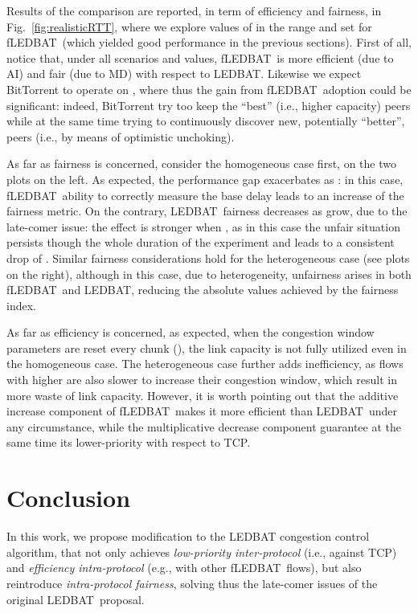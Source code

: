 \documentclass[conference]{IEEEtran}
\newcommand{\figR}[1]{Fig.~\ref{fig:#1}}
\newcommand{\btledbat}[0]{LEDBAT}
\newcommand{\fledbat}[0]{fLEDBAT}
\begin{document}
Results of the comparison are reported, in term of efficiency and fairness, in
\figR{realisticRTT}, where we explore values of  in the  range and set 
for \fledbat\ (which yielded good performance in the previous sections).
First of all, notice that, under all scenarios and  values, \fledbat\ is more efficient
(due to AI) and fair (due to MD) with respect to \btledbat.
Likewise we expect BitTorrent to operate on , where thus the gain from \fledbat\
adoption could be significant: indeed, BitTorrent try too keep the ``best'' (i.e., higher capacity)
peers  while at the same time trying to continuously discover new, potentially ``better'',
peers (i.e., by means of optimistic unchoking).

As far as fairness is concerned, consider the homogeneous case first, on the two plots on the left.
As expected, the performance gap exacerbates as : in this case, \fledbat\ ability
to correctly measure the base delay leads to an increase of the fairness metric. On the contrary,
\btledbat\ fairness decreases as  grow, due to the late-comer issue: the effect is stronger
when , as in this case the unfair situation persists though the whole duration of the experiment
and leads to a consistent drop of . Similar fairness considerations hold for the heterogeneous
case (see plots on the right), although in this case, due to  heterogeneity,  unfairness
arises in both \fledbat\ and \btledbat, reducing the absolute values achieved by the fairness index.

As far as efficiency  is concerned, as expected, when the congestion window parameters are
reset every chunk (), the link capacity is not fully utilized even in the homogeneous case.
The heterogeneous case further adds inefficiency, as flows with higher  are also slower to
increase their congestion window, which result in more waste of link capacity.
However, it is worth pointing out that the additive increase component of \fledbat\ makes it more efficient than \btledbat\ under any circumstance, while the multiplicative decrease component guarantee at the same time its lower-priority with respect to TCP.


\section{Conclusion}\label{sec:outro}

In this work, we propose modification to the LEDBAT congestion control algorithm, that not only achieves \emph{low-priority inter-protocol} (i.e., against TCP) and \emph{efficiency intra-protocol} (e.g., with other \fledbat\  flows), but also reintroduce \emph{intra-protocol fairness}, solving thus the late-comer issues of the original \btledbat\ proposal.
\end{document}

